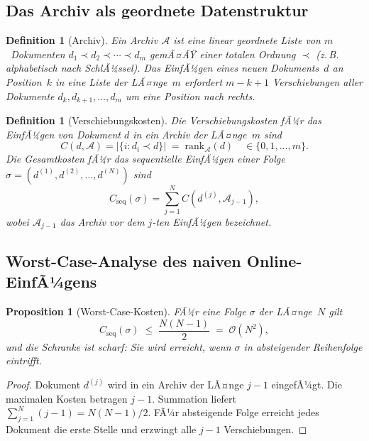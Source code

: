 ﻿\documentclass[12pt, a4paper]{article}
\newtheorem{proposition}[theorem]{Proposition}
\newtheorem{definition}[theorem]{Definition}
\begin{document}
\subsection{Das Archiv als geordnete Datenstruktur}

\begin{definition}[Archiv]\label{def:archive}
Ein \emph{Archiv} $\mathcal{A}$ ist eine linear geordnete Liste von
$m$~Dokumenten $d_1 \prec d_2 \prec \cdots \prec d_m$ gemÃ¤ÃŸ einer totalen
Ordnung $\prec$ (z.\,B. alphabetisch nach SchlÃ¼ssel). Das \emph{EinfÃ¼gen}
eines neuen Dokuments~$d$ an Position~$k$ in eine Liste der LÃ¤nge~$m$
erfordert $m - k + 1$ \emph{Verschiebungen} aller Dokumente $d_k, d_{k+1},
\ldots, d_m$ um eine Position nach rechts.
\end{definition}

\begin{definition}[Verschiebungskosten]\label{def:cost}
Die \emph{Verschiebungskosten} fÃ¼r das EinfÃ¼gen von Dokument $d$ in ein
Archiv der LÃ¤nge~$m$ sind
\[
  C(d, \mathcal{A}) = \bigl|\{i : d_i \prec d\}\bigr| \;=\; \mathrm{rank}_{\mathcal{A}}(d)
  \quad\in\{0, 1, \ldots, m\}.
\]
Die Gesamtkosten fÃ¼r das sequentielle EinfÃ¼gen einer Folge
$\sigma = (d^{(1)}, d^{(2)}, \ldots, d^{(N)})$ sind
\[
  C_{\mathrm{seq}}(\sigma) = \sum_{j=1}^{N} C\!\left(d^{(j)},
  \mathcal{A}_{j-1}\right),
\]
wobei $\mathcal{A}_{j-1}$ das Archiv vor dem $j$-ten EinfÃ¼gen bezeichnet.
\end{definition}

\subsection{Worst-Case-Analyse des naiven Online-EinfÃ¼gens}

\begin{proposition}[Worst-Case-Kosten]\label{prop:worstcase}
FÃ¼r eine Folge $\sigma$ der LÃ¤nge~$N$ gilt
\[
  C_{\mathrm{seq}}(\sigma) \;\leq\; \frac{N(N-1)}{2} \;=\; \mathcal{O}(N^2),
\]
und die Schranke ist scharf: Sie wird erreicht, wenn $\sigma$ in absteigender
Reihenfolge eintrifft.
\end{proposition}

\begin{proof}
Dokument $d^{(j)}$ wird in ein Archiv der LÃ¤nge $j-1$ eingefÃ¼gt. Die maximalen
Kosten betragen $j-1$. Summation liefert
$\sum_{j=1}^{N}(j-1) = N(N-1)/2$. FÃ¼r absteigende Folge erreicht jedes
Dokument die erste Stelle und erzwingt alle $j-1$ Verschiebungen.
\end{proof}
\end{document}
